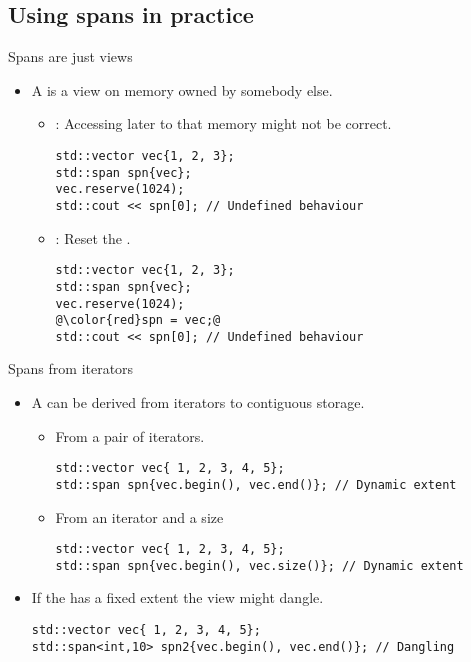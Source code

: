\subsection{Using spans in practice}

\begin{frame}[t,fragile]{Spans are just views}
\begin{itemize}
  \item A  is a view on memory owned by somebody else.
    \begin{itemize}
      \item {}: Accessing later to that memory might not be correct.
\begin{lstlisting}
std::vector vec{1, 2, 3};
std::span spn{vec};
vec.reserve(1024);
std::cout << spn[0]; // Undefined behaviour
\end{lstlisting}

      \item {}: Reset the .
\begin{lstlisting}[escapechar=@]
std::vector vec{1, 2, 3};
std::span spn{vec};
vec.reserve(1024);
@\color{red}spn = vec;@
std::cout << spn[0]; // Undefined behaviour
\end{lstlisting}
    \end{itemize}
\end{itemize}
\end{frame}

\begin{frame}[t,fragile]{Spans from iterators}
\begin{itemize}
  \item A  can be derived from iterators 
        to contiguous storage.
    \begin{itemize}
      \item From a pair of iterators.
\begin{lstlisting}
std::vector vec{ 1, 2, 3, 4, 5};
std::span spn{vec.begin(), vec.end()}; // Dynamic extent
\end{lstlisting}

      \item From an iterator and a size
\begin{lstlisting}
std::vector vec{ 1, 2, 3, 4, 5};
std::span spn{vec.begin(), vec.size()}; // Dynamic extent
\end{lstlisting}
    \end{itemize}

  \item If the  has a fixed extent
        the view might dangle.
\begin{lstlisting}
std::vector vec{ 1, 2, 3, 4, 5};
std::span<int,10> spn2{vec.begin(), vec.end()}; // Dangling
\end{lstlisting}
\end{itemize}
\end{frame}

